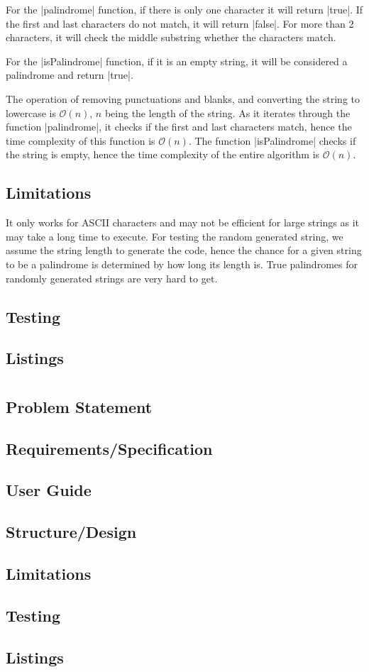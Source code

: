 \documentclass{report}
\begin{document}
For the |palindrome| function, if there is only one character it will return |true|. If the first and last characters do not match, it will return |false|. For more than 2 characters, it will check the middle substring whether the characters match.

For the |isPalindrome| function, if it is an empty string, it will be considered a palindrome and return |true|.

The operation of removing punctuations and blanks, and converting the string to lowercase is \(\mathcal{O}(n)\), \(n\) being the length of the string. As it iterates through the function |palindrome|, it checks if the first and last characters match, hence the time complexity of this function is \(\mathcal{O}(n)\). The function |isPalindrome| checks if the string is empty, hence the time complexity of the entire algorithm is \(\mathcal{O}(n)\).

\section{Limitations}
It only works for ASCII characters and  may not be efficient for large strings as it may take a long time to execute. For testing the random generated string, we assume the string length to generate the code, hence the chance for a given string to be a palindrome is determined by how long its length is. True palindromes for randomly generated strings are very hard to get.
\section{Testing}
\section{Listings}
\chapter{}
\section{Problem Statement}
\section{Requirements/Specification}
\section{User Guide}
\section{Structure/Design}
\section{Limitations}
\section{Testing}
\section{Listings}
\end{document}
